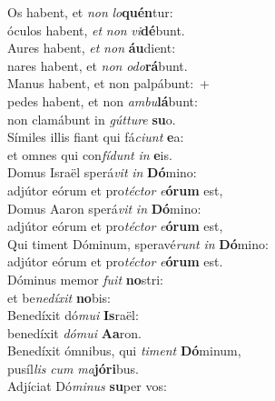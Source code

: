 \oddverse Os habent, et \textit{non} \textit{lo}\textbf{quén}tur:~\*\\
\oddverse óculos habent, \textit{et} \textit{non} \textit{vi}\textbf{dé}bunt.\\
\evenverse Aures habent, \textit{et} \textit{non} \textbf{áu}dient:~\*\\
\evenverse nares habent, et \textit{non} \textit{o}\textit{do}\textbf{rá}bunt.\\
\oddverse Manus habent, et non palpábunt:~+\\
\oddverse  pedes habent, et non \textit{am}\textit{bu}\textbf{lá}bunt:~\*\\
\oddverse non clamábunt in \textit{gút}\textit{tu}\textit{re} \textbf{su}o.\\
\evenverse Símiles illis fiant qui fá\textit{ci}\textit{unt} \textbf{e}a:~\*\\
\evenverse et omnes qui con\textit{fí}\textit{dunt} \textit{in} \textbf{e}is.\\
\oddverse Domus Israël sperá\textit{vit} \textit{in} \textbf{Dó}mino:~\*\\
\oddverse adjútor eórum et pro\textit{té}\textit{ctor} \textit{e}\textbf{ó}\textbf{rum} est,\\
\evenverse Domus Aaron sperá\textit{vit} \textit{in} \textbf{Dó}mino:~\*\\
\evenverse adjútor eórum et pro\textit{té}\textit{ctor} \textit{e}\textbf{ó}\textbf{rum} est,\\
\oddverse Qui timent Dóminum, speravé\textit{runt} \textit{in} \textbf{Dó}mino:~\*\\
\oddverse adjútor eórum et pro\textit{té}\textit{ctor} \textit{e}\textbf{ó}\textbf{rum} est.\\
\evenverse Dóminus memor \textit{fu}\textit{it} \textbf{no}stri:~\*\\
\evenverse et be\textit{ne}\textit{dí}\textit{xit} \textbf{no}bis:\\
\oddverse Benedíxit dó\textit{mu}\textit{i} \textbf{Is}raël:~\*\\
\oddverse benedíxit \textit{dó}\textit{mu}\textit{i} \textbf{A}\textbf{a}ron.\\
\evenverse Benedíxit ómnibus, qui \textit{ti}\textit{ment} \textbf{Dó}minum,~\*\\
\evenverse pusíl\textit{lis} \textit{cum} \textit{ma}\textbf{jó}\textbf{ri}bus.\\
\oddverse Adjíciat Dó\textit{mi}\textit{nus} \textbf{su}per vos:~\*\\
